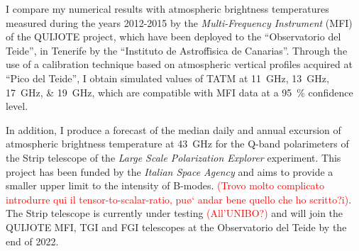 \documentclass[11pt,letterpaper]{article}
\begin{document}
I compare my numerical results with atmospheric brightness temperatures
measured during the years 2012-2015 by the \emph{Multi-Frequency
Instrument} (MFI) of the QUIJOTE project, which have been deployed to the
``Observatorio del Teide'', in Tenerife by the ``Instituto de
Astrof\'fisica de Canarias''. Through the use of a calibration technique
based on atmospheric vertical profiles acquired at ``Pico del Teide'', I
obtain simulated values of TATM at \SIlist{11;13;17;19}{\giga\hertz}, which
are compatible with MFI data at a \SI{95}{\percent} confidence level.

In addition, I produce a forecast of the median daily and annual excursion
of atmospheric brightness temperature at \SI{43}{\giga\hertz} for the
Q-band polarimeters of the Strip telescope of the \emph{Large Scale
Polarization Explorer} experiment. This project has been funded by the
\emph{Italian Space Agency} and aims to provide a smaller upper limit to
the intensity of B-modes.  \textcolor{red}{(Trovo molto complicato
introdurre qui il tensor-to-scalar-ratio, pu\o` andar bene quello che ho
scritto?i)}.  The Strip telescope is currently under testing
\textcolor{red}{(All'UNIBO?)} and will join the QUIJOTE MFI, TGI and FGI
telescopes at the Observatorio del Teide by the end of 2022.
\end{document}

